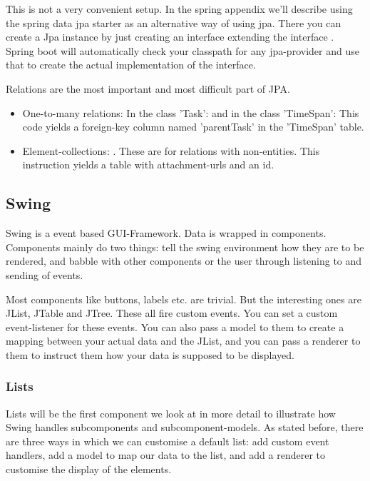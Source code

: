 This is not a very convenient setup. In the spring appendix we'll describe using the spring data jpa starter as an alternative way of using jpa. There you can create a Jpa instance by just creating an interface extending the interface .  Spring boot will automatically check your classpath for any jpa-provider and use that to create the actual implementation of the interface. 


Relations are the most important and most difficult part of JPA.

\begin{itemize}
	\item One-to-many relations: In the class 'Task':  and in the class 'TimeSpan':  This code yields a foreign-key column named 'parentTask' in the 'TimeSpan' table.
	\item Element-collections: . These are for relations with non-entities. This instruction yields a table with attachment-urls and an id.
\end{itemize}

\subsection{Swing}
 
 Swing is a event based GUI-Framework.
 Data is wrapped in components. Components mainly do two things: tell the swing environment how they are to be rendered, and babble with other components or the user through listening to and sending of events. 
 
 
 Most components like buttons, labels etc. are trivial. But the interesting ones are JList, JTable and JTree. These all fire custom events. 
 You can set a custom event-listener for these events. You can also pass a model to them to create a mapping between your actual data and the JList, and you can pass a renderer to them to instruct them how your data is supposed to be displayed. 
 
 
 \subsubsection{Lists}
 
 Lists will be the first component we look at in more detail to illustrate how Swing handles subcomponents and subcomponent-models. As stated before, there are three ways in which we can customise a default list: add custom event handlers, add a model to map our data to the list, and add a renderer to customise the display of the elements. 
 
